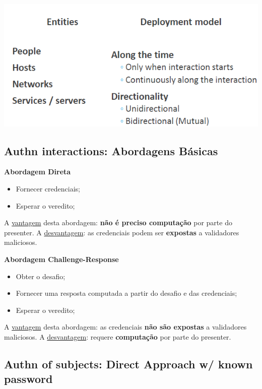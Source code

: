 \documentclass{article}
\begin{document}
\vspace{2mm}

\begin{center}
  \includegraphics[scale=0.55]{20}
\end{center}

\pagebreak

\subsection{Authn interactions: Abordagens Básicas}

\begin{flushleft}
  \textbf{Abordagem Direta}
  \begin{itemize}
    \item Fornecer credenciais;
    \item Esperar o veredito;
  \end{itemize}
  A \uline{vantagem} desta abordagem: \textbf{não é preciso computação} por parte do presenter.
  A \uline{desvantagem}: as credenciais podem ser \textbf{expostas} a validadores maliciosos.

  \vspace{2mm}

  \textbf{Abordagem Challenge-Response}
  \begin{itemize}
    \item Obter o desafio;
    \item Fornecer uma resposta computada a partir do desafio e das credenciais;
    \item Esperar o veredito;
  \end{itemize}
  A \uline{vantagem} desta abordagem: as credenciais \textbf{não são expostas} a validadores maliciosos.
  A \uline{desvantagem}: requere \textbf{computação} por parte do presenter.
\end{flushleft}

\subsection{Authn of subjects: Direct Approach w/ known password}
\end{document}
